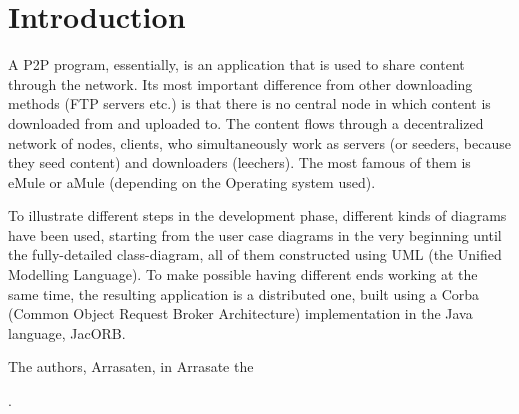 \section*{Introduction}

A P2P program, essentially, is an application that is used to share content through the network. Its most important difference from other downloading methods (FTP servers etc.) is that there is no central node in which content is downloaded from and uploaded to. The content flows through a decentralized network of nodes, clients, who simultaneously work as servers (or seeders, because they seed content) and downloaders (leechers). The most famous of them is eMule or aMule (depending on the Operating system used).

To illustrate different steps in the development phase, different kinds of diagrams have been used, starting from the user case diagrams in the very beginning until the fully-detailed class-diagram, all of them constructed using UML (the Unified Modelling Language). To make possible having different ends working at the same time, the resulting application is a distributed one, built using a Corba (Common Object Request Broker Architecture) implementation in the Java language, JacORB.


\begin{flushright}
The authors, Arrasaten, in Arrasate the \date{\today}.
\end{flushright}

